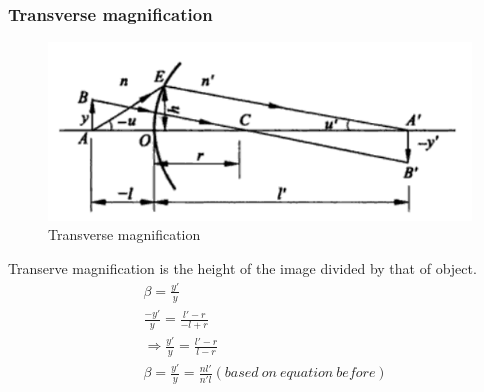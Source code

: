 \documentclass[../main.tex]{subfiles}
\begin{document}
	\subsubsection{Transverse magnification}
	\begin{figure}[h!]
		\centering
		\includegraphics[scale=0.5]{../graphics/Geometrical_optics8.png}
		\caption{Transverse magnification}
		\label{fig:transverse}
	\end{figure}
	\FloatBarrier
	Transerve magnification is the height of the image divided by that of object.
	\begin{align}
	&\beta=\frac{y'}{y}\\
	&\frac{-y'}{y}=\frac{l'-r}{-l+r}\\
	&\Rightarrow\frac{y'}{y}=\frac{l'-r}{l-r}\\
	&\beta=\frac{y'}{y}=\frac{nl'}{n'l}(based\ on\ equation\ before)
	\end{align}
\end{document}
